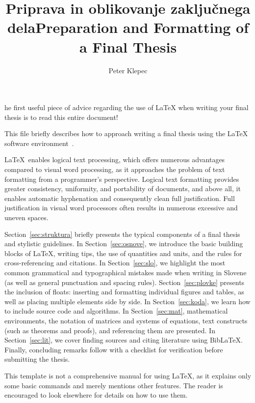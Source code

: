 \documentclass[9pt]{style/friteza}
\title[slovene]{Priprava in oblikovanje zaključnega dela}
\title[english]{Preparation and Formatting of a Final Thesis}
\author{Peter Klepec}
\begin{document}
\maketitle

he first useful piece of advice regarding the use of \LaTeX{} when writing your final thesis is to read this entire document!

This file briefly describes how to approach writing a final thesis using the \LaTeX{} software environment~\cite{lamport,nenajkrajsi}.

\LaTeX\ enables logical text processing, which offers numerous advantages compared to visual word processing, as it approaches the problem of text formatting from a programmer's perspective.
Logical text formatting provides greater consistency, uniformity, and portability of documents, and above all, it enables automatic hyphenation and consequently clean full justification. Full justification in visual word processors often results in numerous excessive and uneven spaces.

Section~\ref{sec:struktura} briefly presents the typical components of a final thesis and stylistic guidelines.
In Section~\ref{sec:osnove}, we introduce the basic building blocks of \LaTeX{}, writing tips, the use of quantities and units, and the rules for cross-referencing and citations.
In Section~\ref{sec:slo}, we highlight the most common grammatical and typographical mistakes made when writing in Slovene (as well as general punctuation and spacing rules).
Section~\ref{sec:plovke} presents the inclusion of floats: inserting and formatting individual figures and tables, as well as placing multiple elements side by side.
In Section~\ref{sec:koda}, we learn how to include source code and algorithms.
In Section~\ref{sec:mat}, mathematical environments, the notation of matrices and systems of equations, text constructs (such as theorems and proofs), and referencing them are presented.
In Section~\ref{sec:lit}, we cover finding sources and citing literature using Bib\LaTeX{}.
Finally, concluding remarks follow with a checklist for verification before submitting the thesis.

This template is not a comprehensive manual for using \LaTeX{}, as it explains only some basic commands and merely mentions other features. The reader is encouraged to look elsewhere for details on how to use them.
\end{document}

